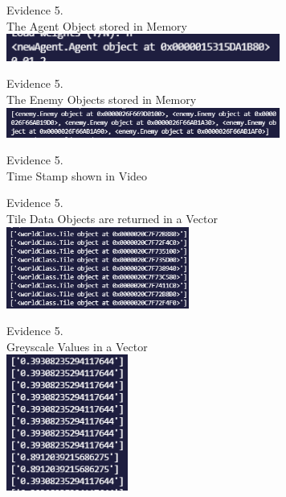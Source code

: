 \setcounter{magicrownumbers}{0}
\begin{center}
    {\large Evidence 5.\rn } \\ 
    \vspace{0.3cm}
    The Agent Object stored in Memory \\
    \includegraphics[width=9cm]{Images/Testing/T5.1.1.PNG} \\
    \vspace{1cm}

    {\large Evidence 5.\rn } \\ 
    \vspace{0.3cm}
    The Enemy Objects stored in Memory \\
    \includegraphics[width=9cm]{Images/Testing/T5.2.1.PNG} \\
    \vspace{1cm}

    {\large Evidence 5.\rn } \\ 
    \vspace{0.3cm}
    Time Stamp shown in Video
    \vspace{1cm}

    {\large Evidence 5.\rn } \\ 
    \vspace{0.3cm}
    Tile Data Objects are returned in a Vector \\
    \includegraphics[width=6cm]{Images/Testing/T5.4.1.PNG} \\
    \vspace{1cm}

    {\large Evidence 5.\rn } \\ 
    \vspace{0.3cm}
    Greyscale Values in a Vector \\
    \includegraphics[width=4cm]{Images/Testing/T5.5.1.PNG} \\
    \vspace{1cm}


\end{center}
